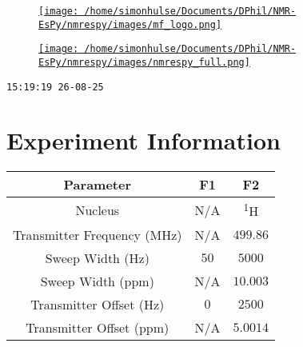 \documentclass[8pt]{article}
\begin{document}
\begin{figure}[!ht]
\begin{minipage}[b][2.5cm][c]{.72\textwidth}
\href{http://foroozandeh.chem.ox.ac.uk/home}%
{\texttt{[image: /home/simonhulse/Documents/DPhil/NMR-EsPy/nmrespy/images/mf\_logo.png]}}
\end{minipage}
\begin{minipage}[b][2.5cm][c]{.27\textwidth}
\href{https://foroozandehgroup.github.io/NMR-EsPy}%
{\texttt{[image: /home/simonhulse/Documents/DPhil/NMR-EsPy/nmrespy/images/nmrespy\_full.png]}}
\end{minipage}
\end{figure}
\texttt{15:19:19 26-08-25}



\section*{Experiment Information}
\begin{longtable}[l]{c c c}
\toprule
Parameter & F1 & F2\\
\midrule
Nucleus & N/A & \textsuperscript{1}H\\
Transmitter Frequency (MHz) & N/A & $\num{499.86}$\\
Sweep Width (Hz) & $\num{50}$ & $\num{5000}$\\
Sweep Width (ppm) & N/A & $\num{10.003}$\\
Transmitter Offset (Hz) & $\num{0}$ & $\num{2500}$\\
Transmitter Offset (ppm) & N/A & $\num{5.0014}$\\
\bottomrule
\end{longtable}
\end{document}
